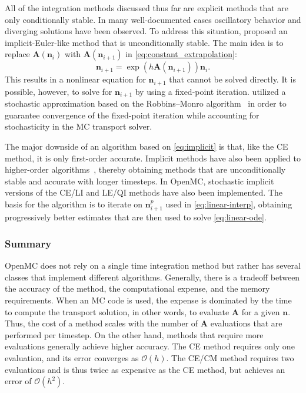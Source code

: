 \documentclass[3p,authoryear]{elsarticle}
\newcommand{\vect}[1]{\mathbf{#1}} %
\begin{document}
All of the integration methods discussed thus far are explicit methods that are
only conditionally stable. In many well-documented cases oscillatory behavior
and diverging solutions have been observed. To address this situation,
\citet{dufek2013ane} proposed an implicit-Euler-like method that is
unconditionally stable. The main idea is to replace $\vect{A}(\vect{n}_i)$ with
$\vect{A}(\vect{n}_{i+1})$ in \cref{eq:constant_extrapolation}:
\begin{equation}
  \label{eq:implicit}
  \vect{n}_{i+1} = \exp \left( h\vect{A}(\vect{n}_{i+1}) \right) \vect{n}_i.
\end{equation}
This results in a nonlinear equation for $\vect{n}_{i+1}$ that cannot be solved
directly. It is possible, however, to solve for $\vect{n}_{i+1}$ by using a
fixed-point iteration. \citet{dufek2013ane} utilized a stochastic approximation
based on the Robbins--Monro algorithm~\citep{robbins1951ams} in order to
guarantee convergence of the fixed-point iteration while accounting for
stochasticity in the MC transport solver.

The major downside of an algorithm based on \cref{eq:implicit} is that, like the
CE method, it is only first-order accurate. Implicit methods have also been
applied to higher-order
algorithms~\citep{kotlyar2014ane,kotlyar2016ane,cosgrove2020ane}, thereby
obtaining methods that are unconditionally stable and accurate with longer
timesteps. In OpenMC, stochastic implicit versions of the CE/LI and LE/QI
methods have also been implemented. The basis for the algorithm is to iterate on
$\vect{n}_{i+1}^p$ used in \cref{eq:linear-interp}, obtaining progressively
better estimates that are then used to solve \cref{eq:linear-ode}.

\subsubsection{Summary}

OpenMC does not rely on a single time integration method but rather has several
classes that implement different algorithms. Generally, there is a tradeoff
between the accuracy of the method, the computational expense, and the memory
requirements. When an MC code is used, the expense is dominated by the time to
compute the transport solution, in other words, to evaluate $\vect{A}$ for a
given $\vect{n}$. Thus, the cost of a method scales with the number of
$\vect{A}$ evaluations that are performed per timestep. On the other hand,
methods that require more evaluations generally achieve higher accuracy. The CE
method requires only one evaluation, and its error converges as
$\mathcal{O}(h)$. The CE/CM method requires two evaluations and is thus twice as
expensive as the CE method, but achieves an error of $\mathcal{O}(h^2)$.
\end{document}
